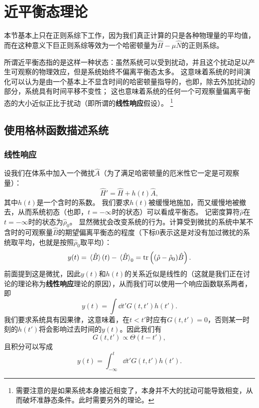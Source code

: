 \documentclass[hyperref, UTF8, a4paper]{ctexart}
\begin{document}
\section{近平衡态理论}


本节基本上只在正则系综下工作，因为我们真正计算的只是各种物理量的平均值，而在这种意义下巨正则系综等效为一个哈密顿量为$\hat{H}-\mu\hat{N}$的正则系综。

所谓近平衡态指的是这样一种状态：虽然系统可以受到扰动，并且这个扰动足以产生可观察的物理效应，但是系统始终不偏离平衡态太多。
这意味着系统的时间演化可以认为是由一个基本上不显含时间的哈密顿量指导的，也即，除去外加扰动的部分，系统具有时间平移不变性；
这也意味着系统的任何一个可观察量偏离平衡态的大小近似正比于扰动（即所谓的\textbf{线性响应}假设）。%
\footnote{需要注意的是如果系统本身接近相变了，本身并不大的扰动可能导致相变，从而破坏准静态条件。此时需要另外的理论。}%

\subsection{使用格林函数描述系统}

\subsubsection{线性响应}\label{sec:linear-response}

设我们在体系中加入一个微扰$\hat{A}$（为了满足哈密顿量的厄米性它一定是可观察量）：
\begin{equation}
    \hat{H}' = \hat{H} + h(t) \hat{A},
\end{equation}
其中$h(t)$是一个含时的系数。
我们要求$h(t)$被缓慢地施加，而又缓慢地被撤去，从而系统初态（也即，$t=-\infty$时的状态）可以看成平衡态。
记密度算符$\hat{\rho}$在$t=-\infty$时的状态为$\hat{\rho}_0$。
显然微扰会改变系统的行为。计算受到微扰的系统中某不含时的可观察量$\hat{B}$的期望偏离平衡态的程度（下标0表示这是对没有加过微扰的系统取平均，也就是按照$\hat{\rho}_0$取平均）：
\[
    y(t) = \expval*{\hat{B}}(t) - \expval*{\hat{B}}_0 = \trace\left((\hat{\rho} - \hat{\rho}_0)\hat{B}\right).
\]
前面提到这是微扰，因此$y(t)$和$h(t)$的关系近似是线性的（这就是我们正在讨论的理论称为\textbf{线性响应}理论的原因），从而我们可以使用一个响应函数联系两者，即
\[
    y(t) = \int \dd{t'} G(t, t') h(t').
\]
我们要求系统具有因果律，这意味着，在$t<t'$时应有$G(t,t')=0$，否则某一时刻的$h(t')$将会影响过去时间的$y(t)$。因此我们有
\[
    G(t,t') \propto \Theta(t-t'),
\]
且积分可以写成
\[
    y(t) = \int_{-\infty}^t \dd{t'} G(t, t') h(t').
\]
\end{document}
